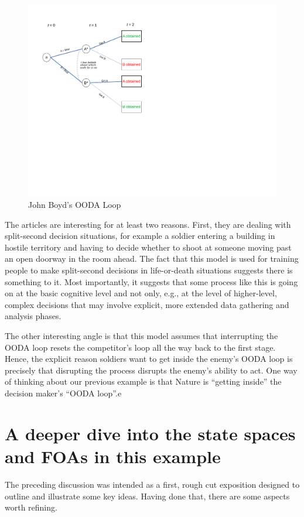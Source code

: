 \documentclass[
11pt,
titlepage,
reqno,
]{article}%
\theoremstyle{definition}
\begin{document}
\begin{figure}[h!]
	\centering
	\includegraphics*[page=14,trim = 0in 2in 0in 0in,scale=.65]{Awareness_Diagrams_All}
	\caption{John Boyd's OODA Loop\label{Diag: p-14}}%
\end{figure}

The articles are interesting for at least two reasons. First, they are dealing with split-second decision situations, for example a soldier entering a building in hostile territory and having to decide whether to shoot at someone moving past an open doorway in the room ahead. The fact that this model is used for training people to make split-second decisions in life-or-death situations suggests there is something to it. Most importantly, it suggests that some process like this is going on at the basic cognitive level and not only, e.g., at the level of higher-level, complex decisions that may involve explicit, more extended data gathering and analysis phases. 

The other interesting angle is that this model assumes that interrupting the OODA loop resets the competitor's loop all the way back to the first stage. Hence, the explicit reason soldiers want to get inside the enemy's OODA loop is precisely that disrupting the process disrupts the enemy's ability to act. One way of thinking about our previous example is that Nature is ``getting inside'' the decision maker's ``OODA loop''.e

\section{A deeper dive into the state spaces and FOAs in this example}
The preceding discussion was intended as a first, rough cut exposition designed to outline and illustrate some key ideas. Having done that, there are some aspects worth refining.  
\end{document}
